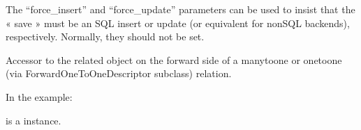 \documentclass[letterpaper,10pt,french]{sphinxmanual}
\begin{document}
\begin{fulllineitems}
\begin{fulllineitems}
\sphinxAtStartPar
The “force\_insert” and “force\_update” parameters can be used to insist
that the « save » must be an SQL insert or update (or equivalent for
non\sphinxhyphen{}SQL backends), respectively. Normally, they should not be set.

\end{fulllineitems}


\begin{fulllineitems}
\label{\detokenize{main/model:main.models.Evaluation.semestre}}
\pysigstartsignatures
{}
\pysigstopsignatures
\sphinxAtStartPar
Accessor to the related object on the forward side of a many\sphinxhyphen{}to\sphinxhyphen{}one or
one\sphinxhyphen{}to\sphinxhyphen{}one (via ForwardOneToOneDescriptor subclass) relation.

\sphinxAtStartPar
In the example:

\begin{sphinxVerbatim}[commandchars=\\\{\}]
 
       
\end{sphinxVerbatim}

\sphinxAtStartPar
{} is a  instance.

\end{fulllineitems}


\begin{fulllineitems}
\label{\detokenize{main/model:main.models.Evaluation.semestre_id}}
\pysigstartsignatures
{}
\pysigstopsignatures
\end{fulllineitems}


\end{fulllineitems}

\end{document}
